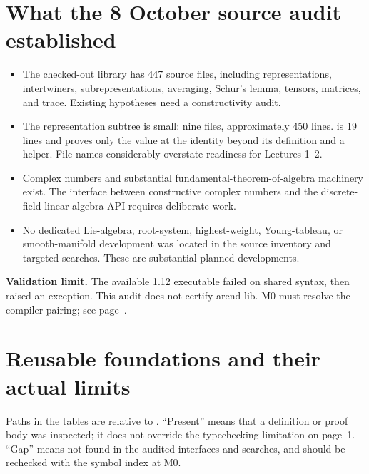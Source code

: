 \documentclass[11pt,a4paper]{article}
\newcommand{\code}[1]{\texttt{\detokenize{#1}}}
\begin{document}
\section*{What the 8 October source audit established}
\begin{itemize}
  \item The checked-out library has 447 \code{.ard} source files, including
  representations, intertwiners, subrepresentations, averaging, Schur's lemma,
  tensors, matrices, and trace. Existing hypotheses need a constructivity audit.
  \item The representation subtree is small: nine files, approximately 450
  lines. \code{Characters.ard} is 19 lines and proves only the value at the
  identity beyond its definition and a helper. File names considerably
  overstate readiness for Lectures 1--2.
  \item Complex numbers and substantial fundamental-theorem-of-algebra
  machinery exist. The interface between constructive complex numbers and
  the discrete-field linear-algebra API requires deliberate work.
  \item No dedicated Lie-algebra, root-system, highest-weight, Young-tableau,
  or smooth-manifold development was located in the source inventory and
  targeted searches. These are substantial planned developments.
\end{itemize}

\textbf{Validation limit.} The available 1.12 executable failed on shared
\code{\Cat} syntax, then raised an exception. This audit does not certify
arend-lib. M0 must resolve the compiler pairing; see page~\pageref{sec:reproduce}.

\newpage
\section{Reusable foundations and their actual limits}\label{sec:audit}
Paths in the tables are relative to \code{arend-lib/src/}. ``Present'' means
that a definition or proof body was inspected; it does not override the
typechecking limitation on page~1. ``Gap'' means not found in the audited
interfaces and searches, and should be rechecked with the symbol index at M0.
\end{document}
